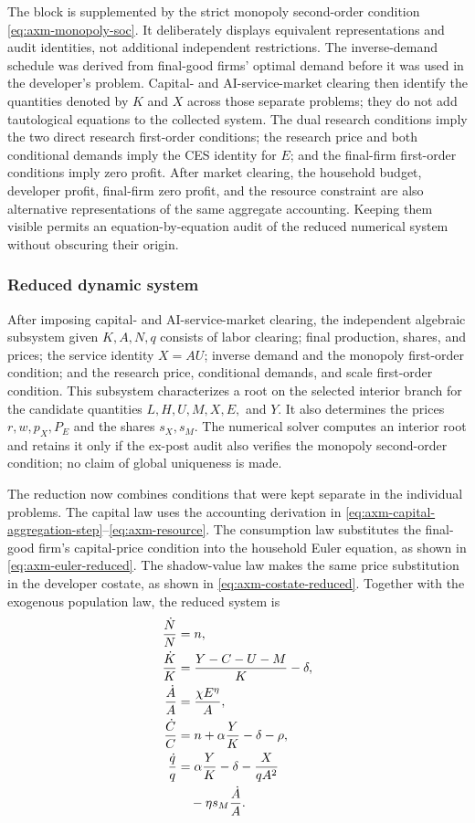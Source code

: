 \endgroup
The block is supplemented by the strict monopoly second-order condition
\eqref{eq:axm-monopoly-soc}. It deliberately displays equivalent
representations and audit identities, not additional independent restrictions.
The inverse-demand schedule was derived from final-good firms' optimal demand
before it was used in the developer's problem. Capital- and AI-service-market
clearing then identify the quantities denoted by \(K\) and \(X\) across those
separate problems; they do not add tautological equations to the collected
system.
The dual research conditions imply the two direct research first-order
conditions; the research price and both conditional demands imply the CES
identity for \(E\); and the final-firm first-order conditions imply zero profit.
After market clearing, the household budget, developer profit, final-firm zero
profit, and the resource constraint are also alternative representations of the
same aggregate accounting. Keeping them visible permits an equation-by-equation
audit of the reduced numerical system without obscuring their origin.

\subsubsection{Reduced dynamic system}

After imposing capital- and AI-service-market clearing, the independent
algebraic subsystem given \(K,A,N,q\) consists of labor
clearing; final production, shares, and prices; the service identity \(X=AU\);
inverse demand and the monopoly first-order condition; and the research price,
conditional demands, and scale first-order condition. This subsystem
characterizes a root on the selected interior branch for the candidate
quantities \(L,H,U,M,X,E,\) and \(Y\). It also determines the prices
\(r,w,p_X,P_E\) and the shares \(s_X,s_M\). The numerical solver computes an
interior root and retains it only if the ex-post audit also verifies the monopoly
second-order condition; no claim of global uniqueness is made.

The reduction now combines conditions that were kept separate in the individual
problems. The capital law uses the accounting derivation in
\eqref{eq:axm-capital-aggregation-step}--\eqref{eq:axm-resource}. The consumption
law substitutes the final-good firm's capital-price condition into the household
Euler equation, as shown in \eqref{eq:axm-euler-reduced}. The shadow-value law
makes the same price substitution in the developer costate, as shown in
\eqref{eq:axm-costate-reduced}. Together with the exogenous population law, the
reduced system is
\begin{subequations}
\label{eq:axm-canonical-system}
\begin{align}
 \frac{\dot N}{N}&=n,\\
 \frac{\dot K}{K}&=\frac{Y-C-U-M}{K}-\delta,\\
 \frac{\dot A}{A}&=\frac{\chi E^\eta}{A},\\
 \frac{\dot C}{C}&=n+\alpha\frac{Y}{K}-\delta-\rho,\\
 \frac{\dot q}{q}
 &=\alpha\frac{Y}{K}-\delta-\frac{X}{qA^2}\notag\\
 &\quad-\eta s_M\frac{\dot A}{A}.
\end{align}
\end{subequations}
